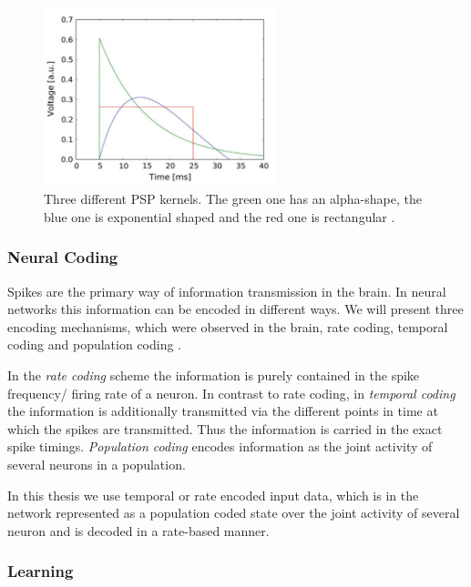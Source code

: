 \begin{figure}
	\centering
    	\includegraphics[width=0.6\textwidth]{imgs/psp_kernel.png} 
    \caption{Three different PSP kernels. The green one has an alpha-shape, the blue one is exponential shaped and the red one is rectangular \cite{Petrovici2016}. }
	\label{fig:pspkernels}
\end{figure}

\subsubsection{Neural Coding} \label{c:neuralcoding}

Spikes are the primary way of information transmission in the brain.
In neural networks this information can be encoded in different ways.
We will present three encoding mechanisms, which were observed in the brain, rate coding, temporal coding and population coding \cite{Meftah2013}.

In the \textit{rate coding} scheme the information is purely contained in the spike frequency/ firing rate of a neuron.
In contrast to rate coding, in \textit{temporal coding} the information is additionally transmitted via the different points in time at which the spikes are transmitted. 
Thus the information is carried in the exact spike timings.
\textit{Population coding} encodes information as the joint activity of several neurons in a population.  

In this thesis we use temporal or rate encoded input data, which is in the network represented as a population coded state over the joint activity of several neuron and is decoded in a rate-based manner. 

\subsubsection{Learning} \label{c:snnlearning}

